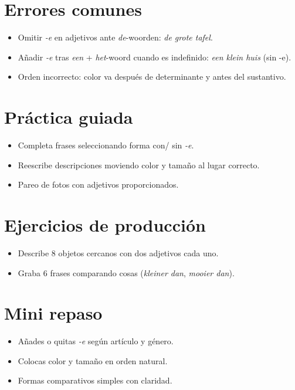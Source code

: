 \section{Errores comunes}
\begin{itemize}[leftmargin=*]
	\item Omitir \textit{-e} en adjetivos ante \textit{de}-woorden: \textit{de grote tafel}.
	\item Añadir \textit{-e} tras \textit{een} + \textit{het}-woord cuando es indefinido: \textit{een klein huis} (sin -e).
	\item Orden incorrecto: color va después de determinante y antes del sustantivo.
\end{itemize}

\section{Práctica guiada}
\begin{itemize}[leftmargin=*]
	\item Completa frases seleccionando forma con/ sin \textit{-e}.
	\item Reescribe descripciones moviendo color y tamaño al lugar correcto.
	\item Pareo de fotos con adjetivos proporcionados.
\end{itemize}

\section{Ejercicios de producción}
\begin{itemize}[leftmargin=*]
	\item Describe 8 objetos cercanos con dos adjetivos cada uno.
	\item Graba 6 frases comparando cosas (\textit{kleiner dan}, \textit{mooier dan}).
\end{itemize}

\section{Mini repaso}
\begin{itemize}[leftmargin=*]
	\item Añades o quitas \textit{-e} según artículo y género.
	\item Colocas color y tamaño en orden natural.
	\item Formas comparativos simples con claridad.
\end{itemize}

